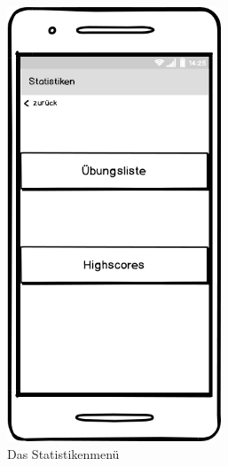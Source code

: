 \begin{figure}[htbp]
\begin{subfigure}{.33\textwidth}
  \includegraphics[width=0.7\textwidth]{img/statmenu.png}
  \caption{Das Statistikenmenü}
\end{subfigure}
\begin{subfigure}{.33\textwidth}
  \centering

\end{subfigure}
\end{figure}
